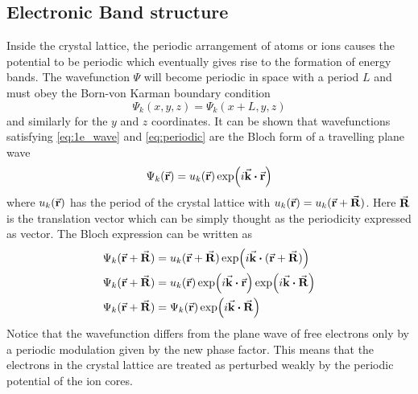     \subsection{Electronic Band structure}
    Inside the crystal lattice, the periodic arrangement of atoms or ions causes the potential to be periodic which eventually gives rise to the formation of energy bands. The wavefunction $\Psi$ will become periodic in space with a period $L$ and must obey the Born-von Karman boundary condition \citep{Herman1959}
\begin{equation} \label{eq:periodic}
    \Psi_k(x,y,z) = \Psi_k(x + L, y, z) 
\end{equation}
and similarly for the $y$ and $z$ coordinates. It can be shown that wavefunctions satisfying \eqref{eq:1e_wave} and \eqref{eq:periodic} are the Bloch form of a travelling plane wave
\begin{equation} \label{eq:Bloch}
    \Psi_k(\va{r}) = u_k(\va{r}) \exp(i \va{k} \vdot \va{r})
\end{equation}  
where $u_k(\va{r})$ has the period of the crystal lattice with $u_k(\va{r}) = u_k(\va{r} + \va{R})$. Here $\va{R}$ is the translation vector which can be simply thought as the periodicity expressed as vector.  The Bloch expression can be written as
\begin{align}
    \Psi_k(\va{r} + \va{R}) &= u_k(\va{r} + \va{R}) \exp(i \va{k} \vdot (\va{r} + \va{R}))  \notag \\
    \Psi_k(\va{r} + \va{R}) &= u_k(\va{r}) \exp(i \va{k} \vdot \va{r})  \exp(i \va{k} \vdot \va{R}) \notag \\
    \Psi_k(\va{r} + \va{R}) &= \Psi_k(\va{r}) \exp(i \va{k} \vdot \va{R}) 
\end{align}
Notice that the wavefunction differs from the plane wave of free electrons only by a periodic modulation given by the new phase factor. This means that the electrons in the crystal lattice are treated as perturbed weakly by the periodic potential of the ion cores.



